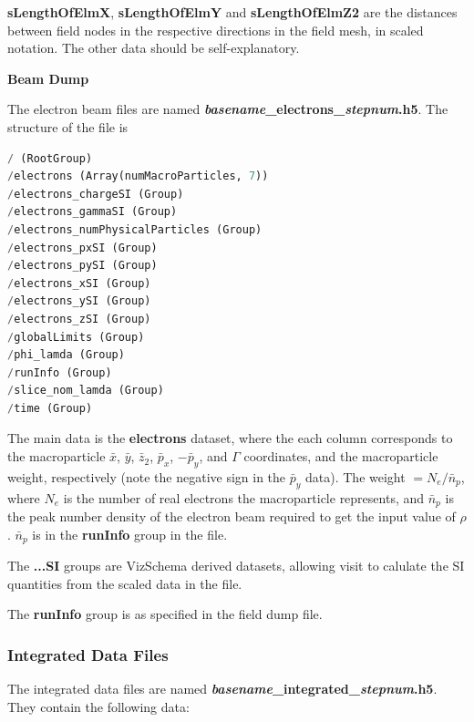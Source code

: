 \documentclass[12pt]{article}%
\begin{document}
{\bf sLengthOfElmX}, {\bf sLengthOfElmY} and {\bf sLengthOfElmZ2} are the distances between field nodes in the respective directions in the field mesh, in scaled notation. The other data should be self-explanatory.



{\bf Beam Dump}

The electron beam files are named {\bf \textit{basename}\_electrons\_\textit{stepnum}.h5}. The structure of the file is

\begin{lstlisting}[language=python]
/ (RootGroup) 
/electrons (Array(numMacroParticles, 7)) 
/electrons_chargeSI (Group) 
/electrons_gammaSI (Group) 
/electrons_numPhysicalParticles (Group) 
/electrons_pxSI (Group) 
/electrons_pySI (Group) 
/electrons_xSI (Group) 
/electrons_ySI (Group) 
/electrons_zSI (Group) 
/globalLimits (Group) 
/phi_lamda (Group) 
/runInfo (Group) 
/slice_nom_lamda (Group) 
/time (Group) 
\end{lstlisting}

The main data is the {\bf electrons} dataset, where the each column corresponds to the macroparticle $\bar{x}$, $\bar{y}$, $\bar{z}_2$, $\bar{p}_x$, $-\bar{p}_y$, and $\Gamma$ coordinates, and the macroparticle weight, respectively (note the negative sign in the $\bar{p}_y$ data). The weight $= N_e / \bar{n}_p$, where $N_e$ is the number of real electrons the macroparticle represents, and $\bar{n}_p$ is the peak number density of the electron beam required to get the input value of $\rho$. $\bar{n}_p$ is in the {\bf runInfo} group in the file.

The {\bf ...SI} groups are VizSchema derived datasets, allowing visit to calulate the SI quantities from the scaled data in the file.

The {\bf runInfo} group is as specified in the field dump file.

\subsubsection{Integrated Data Files}

The integrated data files are named {\bf \textit{basename}\_integrated\_\textit{stepnum}.h5}. They contain the following data:
\end{document}
